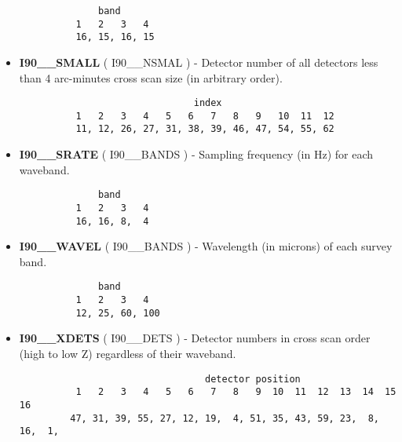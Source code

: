 \begin{itemize}
\begin{minipage}[t]{\textwidth}
\small
\begin{verbatim}
              band
          1   2   3   4
          16, 15, 16, 15
\end{verbatim}
\normalsize
\end{minipage}

\item {\bf I90\_\_SMALL} ( I90\_\_NSMAL ) - Detector number of all detectors less than 4
arc-minutes cross scan size (in arbitrary order).

\begin{minipage}[t]{\textwidth}
\small
\begin{verbatim}
                               index
          1   2   3   4   5   6   7   8   9   10  11  12
          11, 12, 26, 27, 31, 38, 39, 46, 47, 54, 55, 62
\end{verbatim}
\normalsize
\end{minipage}

\item {\bf I90\_\_SRATE} ( I90\_\_BANDS ) - Sampling frequency (in Hz) for
each waveband.

\begin{minipage}[t]{\textwidth}
\small
\begin{verbatim}
              band
          1   2   3   4
          16, 16, 8,  4
\end{verbatim}
\normalsize
\end{minipage}

\item {\bf I90\_\_WAVEL} ( I90\_\_BANDS ) - Wavelength (in microns) of
each survey band.

\begin{minipage}[t]{\textwidth}
\small
\begin{verbatim}
              band
          1   2   3   4
          12, 25, 60, 100
\end{verbatim}
\normalsize
\end{minipage}

\item {\bf I90\_\_XDETS} ( I90\_\_DETS ) - Detector numbers in cross scan order
(high to low Z) regardless of their waveband.

\begin{minipage}[t]{\textwidth}
\small
\begin{verbatim}
                                 detector position
          1   2   3   4   5   6   7   8   9  10  11  12  13  14  15  16
         47, 31, 39, 55, 27, 12, 19,  4, 51, 35, 43, 59, 23,  8, 16,  1,


\end{verbatim}
\end{minipage}
\end{itemize}
